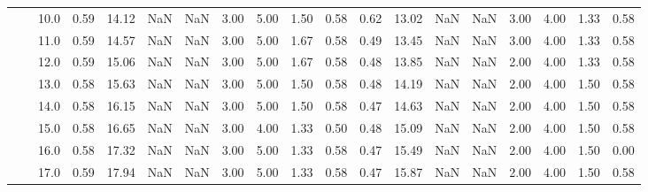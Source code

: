 \begin{tabular}{lllrrrrrrrrrrrrrrrr}
      &     & 10.0 &      0.59 &      14.12 &               NaN &                NaN & 3.00 &   5.00 &             1.50 &                         0.58 &      0.62 &      13.02 &               NaN &                NaN & 3.00 &   4.00 &             1.33 &                         0.58 \\
      &     & 11.0 &      0.59 &      14.57 &               NaN &                NaN & 3.00 &   5.00 &             1.67 &                         0.58 &      0.49 &      13.45 &               NaN &                NaN & 3.00 &   4.00 &             1.33 &                         0.58 \\
      &     & 12.0 &      0.59 &      15.06 &               NaN &                NaN & 3.00 &   5.00 &             1.67 &                         0.58 &      0.48 &      13.85 &               NaN &                NaN & 2.00 &   4.00 &             1.33 &                         0.58 \\
      &     & 13.0 &      0.58 &      15.63 &               NaN &                NaN & 3.00 &   5.00 &             1.50 &                         0.58 &      0.48 &      14.19 &               NaN &                NaN & 2.00 &   4.00 &             1.50 &                         0.58 \\
      &     & 14.0 &      0.58 &      16.15 &               NaN &                NaN & 3.00 &   5.00 &             1.50 &                         0.58 &      0.47 &      14.63 &               NaN &                NaN & 2.00 &   4.00 &             1.50 &                         0.58 \\
      &     & 15.0 &      0.58 &      16.65 &               NaN &                NaN & 3.00 &   4.00 &             1.33 &                         0.50 &      0.48 &      15.09 &               NaN &                NaN & 2.00 &   4.00 &             1.50 &                         0.58 \\
      &     & 16.0 &      0.58 &      17.32 &               NaN &                NaN & 3.00 &   5.00 &             1.33 &                         0.58 &      0.47 &      15.49 &               NaN &                NaN & 2.00 &   4.00 &             1.50 &                         0.00 \\
      &     & 17.0 &      0.59 &      17.94 &               NaN &                NaN & 3.00 &   5.00 &             1.33 &                         0.58 &      0.47 &      15.87 &               NaN &                NaN & 2.00 &   4.00 &             1.50 &                         0.58 \\

\end{tabular}
